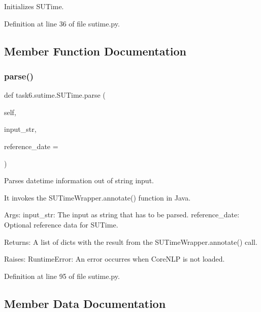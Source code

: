 \begin{DoxyVerb}Initializes SUTime.
\end{DoxyVerb}
 

Definition at line 36 of file sutime.\+py.



\subsection{Member Function Documentation}
\mbox{\label{classtask6_1_1sutime_1_1SUTime_a171448f34de8cab7d19e1353c8495c65}} 
\subsubsection{\texorpdfstring{parse()}{parse()}}
{\footnotesize\ttfamily def task6.\+sutime.\+S\+U\+Time.\+parse (\begin{DoxyParamCaption}\item[{}]{self,  }\item[{}]{input\+\_\+str,  }\item[{}]{reference\+\_\+date = {\ttfamily \textquotesingle{}\textquotesingle{}} }\end{DoxyParamCaption})}

\begin{DoxyVerb}Parses datetime information out of string input.

It invokes the SUTimeWrapper.annotate() function in Java.

Args:
    input_str: The input as string that has to be parsed.
    reference_date: Optional reference data for SUTime.

Returns:
    A list of dicts with the result from the SUTimeWrapper.annotate()
call.

Raises:
    RuntimeError: An error occurres when CoreNLP is not loaded.
\end{DoxyVerb}
 

Definition at line 95 of file sutime.\+py.



\subsection{Member Data Documentation}
\mbox{\label{classtask6_1_1sutime_1_1SUTime_a7e81771e26b1f92df6118f131798a034}} 
